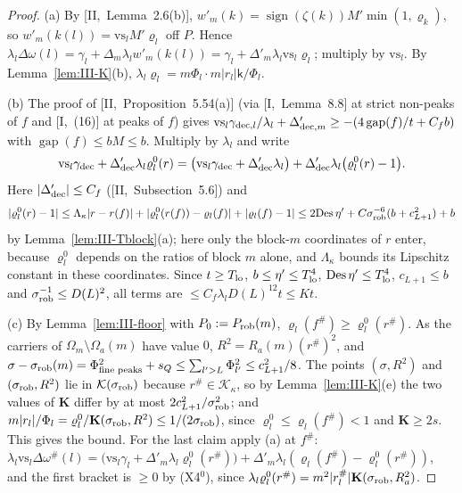 \documentclass[10pt]{amsart}
\theoremstyle{definition}
\theoremstyle{remark}
\newcommand{\sgn}{\operatorname{sign}}
\newcommand{\gap}{\operatorname{gap}}
\begin{document}
\begin{proof}
(a) By [II,~Lemma~2.6(b)], $w'_m(k)=\sgn(\zeta(k))M'\min(1,\varrho_k)$, so
$w'_m(k(l))=\mathrm{vs}_lM'\varrho_l$ off $P$.  Hence $\lambda_l\Delta\omega(l)=
\gamma_l+\Delta_m\lambda_lw'_m(k(l))=\gamma_l+\Delta'_m\lambda_l\mathrm{vs}_l
\varrho_l$; multiply by $\mathrm{vs}_l$.  By Lemma~\ref{lem:III-K}(b),
$\lambda_l\varrho_l=m\Phi_l\cdot m|r_l|\mathsf k/\Phi_l$.

(b) The proof of [II,~Proposition~5.54(a)] (via [I,~Lemma~8.8] at strict
non-peaks of $f$ and [I,~(16)] at peaks of $f$) gives $\mathrm{vs}_l\gamma_{{\rm
dec},l}/\lambda_l+\Delta'_{{\rm dec},m}\ge-(4\gap(f)/t+C_fb)$ with $\gap(f)\le
bM\le b$.  Multiply by $\lambda_l$ and write
\[
 \mathrm{vs}_l\gamma_{\rm dec}+\Delta'_{\rm dec}\lambda_l\varrho^0_l(r)=\big(
 \mathrm{vs}_l\gamma_{\rm dec}+\Delta'_{\rm dec}\lambda_l\big)+\Delta'_{\rm dec}
 \lambda_l\big(\varrho^0_l(r)-1\big).
\]
Here $|\Delta'_{\rm dec}|\le C_f$ ([II,~Subsection~5.6]) and
\[
 |\varrho^0_l(r)-1|\le\Lambda_\kappa|r-r(f)|+|\varrho^0_l(r(f))-\varrho_l(f)|+
 |\varrho_l(f)-1|\le2\mathrm{Des}\,\eta'+C\sigma_{\rm rob}^{-6}(b+c_{L+1}^2)+b
\]
by Lemma~\ref{lem:III-Tblock}(a); here only the block-$m$ coordinates of
$r$ enter, because $\varrho^0_l$ depends on the ratios of block $m$ alone,
and $\Lambda_\kappa$ bounds its Lipschitz constant in these coordinates.
Since $t\ge T_{\rm lo}$, $b\le\eta'\le
T_{\rm lo}^4$, $\mathrm{Des}\,\eta'\le T_{\rm lo}^4$, $c_{L+1}\le b$ and
$\sigma_{\rm rob}^{-1}\le D(L)^2$, all terms are $\le C_f\lambda_lD(L)^{12}t\le Kt$.

(c) By Lemma~\ref{lem:III-floor} with $P_0:=P_{\rm rob}(m)$, $\varrho_l(f^\#)\ge
\varrho^0_l(r^\#)$.  As the carriers of $\Omega_m\setminus\Omega_a(m)$ have value
$0$, $R^2=R_a(m)(r^\#)^2$, and $\sigma-\sigma_{\rm rob}(m)=\Phi^2_{\text{fine
peaks}}+s_Q\le\sum_{l'>L}\Phi_{l'}^2\le c_{L+1}^2/8$.  The points $(\sigma,
R^2)$ and $(\sigma_{\rm rob},R^2)$ lie in $\mathcal K(\sigma_{\rm rob})$ because
$r^\#\in\mathcal K_\kappa$, so by Lemma~\ref{lem:III-K}(e) the two values of
$\mathbf K$ differ by at most $2c_{L+1}^2/\sigma_{\rm rob}^2$; and $m|r_l|/\Phi_l=
\varrho^0_l/\mathbf K(\sigma_{\rm rob},R^2)\le1/(2\sigma_{\rm rob})$, since
$\varrho^0_l\le\varrho_l(f^\#)<1$ and $\mathbf K\ge2s$.  This gives the bound.
For the last claim apply (a) at $f^\#$: $\lambda_l\mathrm{vs}_l\Delta\omega^\#(l)
=\big(\mathrm{vs}_l\gamma_l+\Delta'_m\lambda_l\varrho^0_l(r^\#)\big)+\Delta'_m
\lambda_l(\varrho_l(f^\#)-\varrho^0_l(r^\#))$, and the first bracket is $\ge0$
by (X4$^0$), since $\lambda_l\varrho^0_l(r^\#)=m^2|r^\#_l|\mathbf K(\sigma_{\rm rob},
R_a^2)$.
\end{proof}
\end{document}
